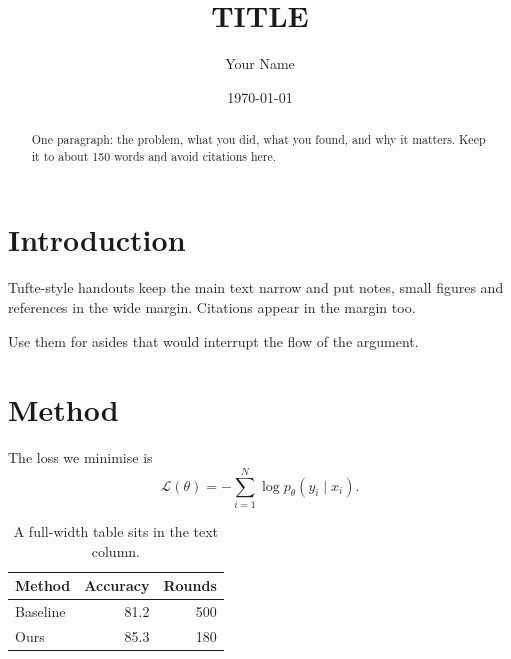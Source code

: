 \documentclass{tufte-handout}
\title{{{TITLE}}}
\author{Your Name}
\date{\today}
\begin{document}
\maketitle

\begin{abstract}
One paragraph: the problem, what you did, what you found, and why it matters. Keep it to about 150 words and avoid citations here.
\end{abstract}

\section{Introduction}

Tufte-style handouts keep the main text narrow and put notes, small figures
and references in the wide margin. Citations appear in
the margin too.\cite{mcmahan2017communication}

Use them for asides that would interrupt the flow of the argument.

\section{Method}

The loss we minimise is
\[
  \mathcal{L}(\theta) = -\sum_{i=1}^{N} \log p_\theta(y_i \mid x_i).
\]

\begin{table}
  \centering
  \begin{tabular}{lrr}
    \toprule
    Method & Accuracy & Rounds \\
    \midrule
    Baseline & 81.2 & 500 \\
    Ours & 85.3 & 180 \\
    \bottomrule
  \end{tabular}
  \caption{A full-width table sits in the text column.}
\end{table}



\end{document}

